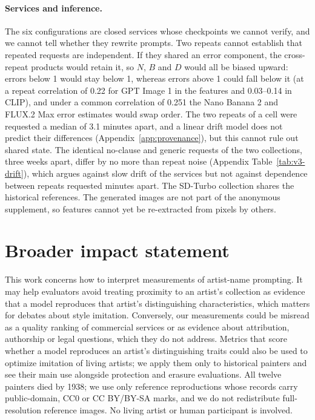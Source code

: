 \documentclass[10pt]{article}
\begin{document}
\paragraph{Services and inference.} The six configurations are closed services whose checkpoints
we cannot verify, and we cannot tell whether they rewrite prompts. Two repeats cannot establish that
repeated requests are independent. If they shared an error component, the cross-repeat products
would retain it, so $N$, $B$ and $D$ would all be biased upward: errors below 1 would stay below 1,
whereas errors above 1 could fall below it (at a repeat correlation of 0.22 for GPT Image 1 in the
features and 0.03--0.14 in CLIP), and under a common correlation of 0.251 the Nano Banana 2 and
FLUX.2 Max error estimates would swap order. The two repeats of a cell were requested a median of
3.1 minutes apart, and a linear drift model does not predict their differences
(Appendix~\ref{app:provenance}), but this cannot rule out shared state. The identical no-clause
and generic requests of the two collections, three weeks apart, differ by no more than repeat noise
(Appendix Table~\ref{tab:v3-drift}), which argues against slow drift of the services but not against
dependence between repeats requested minutes apart. The SD-Turbo collection
shares the historical references. The generated images are not part of the anonymous supplement, so
features cannot yet be re-extracted from pixels by others.

\section*{Broader impact statement}
This work concerns how to interpret measurements of artist-name prompting. It may help evaluators
avoid treating proximity to an artist's collection as evidence that a model reproduces that artist's
distinguishing characteristics, which matters for debates about style imitation. Conversely, our
measurements could be misread as a quality ranking of commercial services or as evidence about
attribution, authorship or legal questions, which they do not address. Metrics that score whether a
model reproduces an artist's distinguishing traits could also be used to optimize imitation of
living artists; we apply them only to historical painters and see their main use alongside
protection and erasure evaluations. All twelve painters died by 1938; we use only reference
reproductions whose records carry public-domain, CC0 or CC BY/BY-SA marks, and we do not
redistribute full-resolution reference images. No living artist or human participant is involved.
\end{document}

